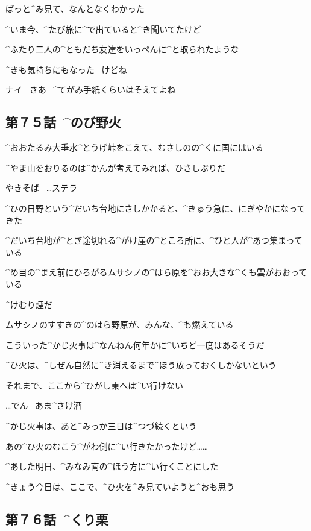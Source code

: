\Maruko ぱっと^{み}{見}て、なんとなくわかった

\Maruko ^{いま}{今}、^{たび}{旅}に^{で}{出}ていると^{き}{聞}いてたけど

\page
\Maruko ^{ふたり}{二人}の^{ともだち}{友達}をいっぺんに^{と}{取}られたような

\Maruko ^{きも}{気持}ちにもなった
\ けどね

\page
\Maruko ナイ
\ さあ
\ ^{てがみ}{手紙}くらいはそえてよね


\subsection{第７５話\ ^{のび}{野火}}

\page[134]
\Alpha ^{おおたるみ}{大垂水}^{とうげ}{峠}をこえて、むさしのの^{くに}{国}にはいる

\Alpha ^{やま}{山}をおりるのは^{かんが}{考}えてみれば、ひさしぶりだ

\page
\Sign やきそば
\ …ステラ

\Alpha ^{ひの}{日野}という^{だいち}{台地}にさしかかると、^{きゅう}{急}に、にぎやかになってきた

\Alpha ^{だいち}{台地}が^{とぎ}{途切}れる^{がけ}{崖}の^{ところ}{所}に、^{ひと}{人}が^{あつ}{集}まっている

\page
\Alpha ^{め}{目}の^{まえ}{前}にひろがるムサシノの^{はら}{原}を^{おお}{大}きな^{くも}{雲}がおおっている

\page
\Alpha ^{けむり}{煙}だ

\Alpha ムサシノのすすきの^{のはら}{野原}が、みんな、^{も}{燃}えている

\Alpha こういった^{かじ}{火事}は^{なんねん}{何年}かに^{いちど}{一度}はあるそうだ

\Alpha ^{ひ}{火}は、^{しぜん}{自然}に^{き}{消}えるまで^{ほう}{放}っておくしかないという

\Alpha それまで、ここから^{ひがし}{東}へは^{い}{行}けない

\page[139]
\Sign …でん
\ あま^{さけ}{酒}

\Alpha ^{かじ}{火事}は、あと^{みっか}{三日}は^{つづ}{続}くという

\Alpha あの^{ひ}{火}のむこう^{がわ}{側}に^{い}{行}きたかったけど……

\page
\Alpha ^{あした}{明日}、^{みなみ}{南}の^{ほう}{方}に^{い}{行}くことにした

\Alpha ^{きょう}{今日}は、ここで、^{ひ}{火}を^{み}{見}ていようと^{おも}{思}う


\subsection{第７６話\ ^{くり}{栗}}

